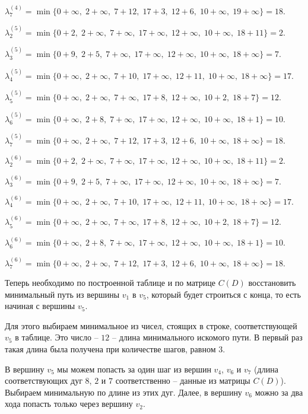 \documentclass[fleqn]{article}
\begin{document}
$\lambda_7^{(4)} =\min\{0+\infty,\; 2+\infty,\; 7+12,\; 17+3,\; 12+6,\; 10+\infty,\; 19+\infty\}=18.$

\medskip

$\lambda_2^{(5)} =\min\{0+2,\; 2+\infty,\; 7+\infty,\; 17+\infty,\; 12+\infty,\; 10+\infty,\; 18+11\}=2.$

$\lambda_3^{(5)} =\min\{0+9,\; 2+5,\; 7+\infty,\; 17+\infty,\; 12+\infty,\; 10+\infty,\; 18+\infty\}=7.$

$\lambda_4^{(5)} =\min\{0+\infty,\; 2+\infty,\; 7+10,\; 17+\infty,\; 12+11,\; 10+\infty,\; 18+\infty\}=17.$

$\lambda_5^{(5)} =\min\{0+\infty,\; 2+\infty,\; 7+\infty,\; 17+8,\; 12+\infty,\; 10+2,\; 18+7\}=12.$

$\lambda_6^{(5)} =\min\{0+\infty,\; 2+8,\; 7+\infty,\; 17+\infty,\; 12+\infty,\; 10+\infty,\; 18+1\}=10.$

$\lambda_7^{(5)} =\min\{0+\infty,\; 2+\infty,\; 7+12,\; 17+3,\; 12+6,\; 10+\infty,\; 18+\infty\}=18.$

\medskip

$\lambda_2^{(6)} =\min\{0+2,\; 2+\infty,\; 7+\infty,\; 17+\infty,\; 12+\infty,\; 10+\infty,\; 18+11\}=2.$

$\lambda_3^{(6)} =\min\{0+9,\; 2+5,\; 7+\infty,\; 17+\infty,\; 12+\infty,\; 10+\infty,\; 18+\infty\}=7.$

$\lambda_4^{(6)} =\min\{0+\infty,\; 2+\infty,\; 7+10,\; 17+\infty,\; 12+11,\; 10+\infty,\; 18+\infty\}=17.$

$\lambda_5^{(6)} =\min\{0+\infty,\; 2+\infty,\; 7+\infty,\; 17+8,\; 12+\infty,\; 10+2,\; 18+7\}=12.$

$\lambda_6^{(6)} =\min\{0+\infty,\; 2+8,\; 7+\infty,\; 17+\infty,\; 12+\infty,\; 10+\infty,\; 18+1\}=10.$

$\lambda_7^{(6)} =\min\{0+\infty,\; 2+\infty,\; 7+12,\; 17+3,\; 12+6,\; 10+\infty,\; 18+\infty\}=18.$

\medskip

Теперь необходимо по построенной таблице и по матрице $C(D)$ восстановить минимальный путь из вершины $v_1$ в $v_5$, который будет строиться с конца, то есть начиная с вершины $v_5$.

Для этого выбираем минимальное из чисел, стоящих в строке, соответствующей $v_5$ в таблице. Это число – $12$ – длина минимального искомого пути. В первый раз такая длина была получена при количестве шагов, равном $3$.

В вершину $v_5$ мы можем попасть за один шаг из вершин $v_4$, $v_6$ и $v_7$ (длина соответствующих дуг $8$, $2$ и $7$ соответственно – данные из матрицы $C(D)$). Выбираем минимальную по длине из этих дуг. Далее, в вершину $v_6$ можно за два хода попасть только через вершину $v_2$.
\end{document}
